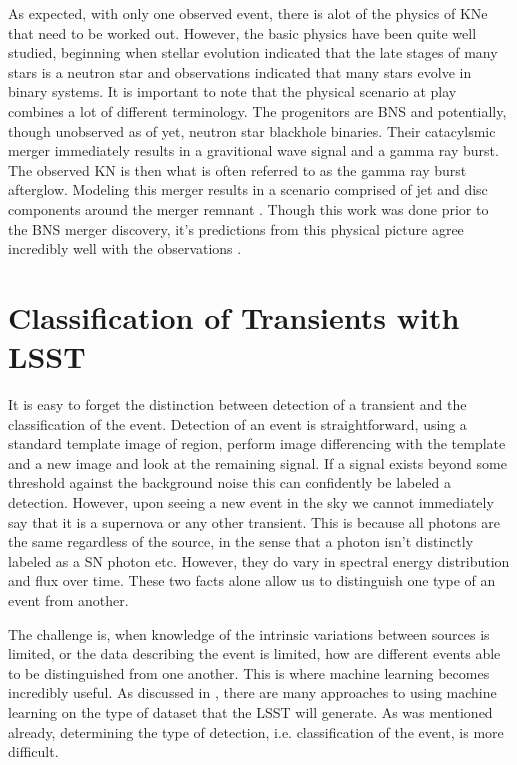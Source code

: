 \documentclass[12pt]{article}
\begin{document}
As expected, with only one observed event, there is alot of the physics of KNe that need to be worked out. However, the basic physics have been quite well studied, beginning when stellar evolution indicated that the late stages of many stars is a neutron star and observations indicated that many stars evolve in binary systems. It is important to note that the physical scenario at play combines a lot of different terminology. The progenitors are BNS and potentially, though unobserved as of yet, neutron star blackhole binaries. Their catacylsmic merger immediately results in a gravitional wave signal and a gamma ray burst. The observed KN is then what is often referred to as the gamma ray burst afterglow. Modeling this merger results in a scenario comprised of jet and disc components around the merger remnant \citep{Rosswog2016a}. Though this work was done prior to the BNS merger discovery, it's predictions from this physical picture agree incredibly well with the observations \citep{Kasliwal2017}.\par

\section{Classification of Transients with LSST} %
It is easy to forget the distinction between detection of a transient and the classification of the event. Detection of an event is straightforward, using a standard template image of region, perform image differencing with the template and a new image and look at the remaining signal. If a signal exists beyond some threshold against the background noise this can confidently be labeled a detection. However, upon seeing a new event in the sky we cannot immediately say that it is a supernova or any other transient. This is because all photons are the same regardless of the source, in the sense that a photon isn't distinctly labeled as a SN photon etc. However, they do vary in spectral energy distribution and flux over time. These two facts alone allow us to distinguish one type of an event from another. \par
The challenge is, when knowledge of the intrinsic variations between sources is limited, or the data describing the event is limited, how are different events able to be distinguished from one another. This is where machine learning becomes incredibly useful. As discussed in \cite{Lochner2016}, there are many approaches to using machine learning on the type of dataset that the LSST will generate. As was mentioned already, determining the type of detection, i.e. classification of the event, is more difficult.
\end{document}

